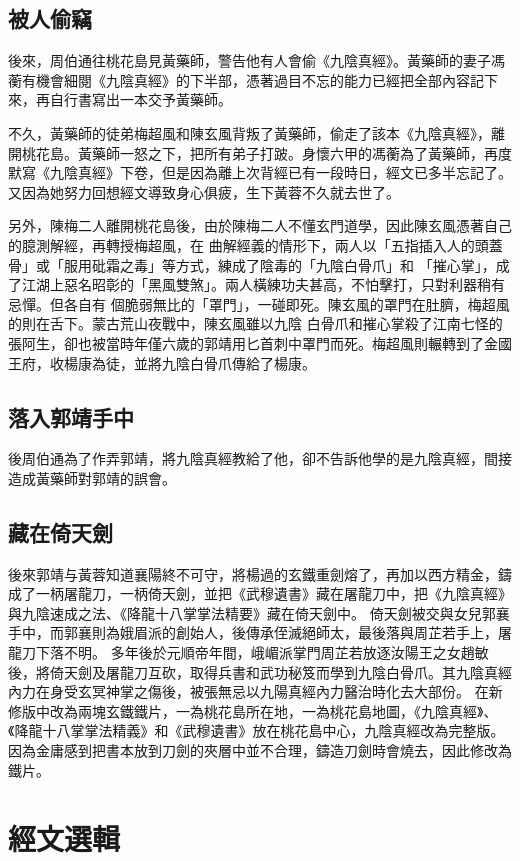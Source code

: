 \subsection{被人偷竊}
後來，周伯通往桃花島見黃藥師，警告他有人會偷《九陰真經》。黃藥師的妻子馮蘅有機會細閱《九陰真經》的下半部，憑著過目不忘的能力已經把全部內容記下來，再自行書寫出一本交予黃藥師。

不久，黃藥師的徒弟梅超風和陳玄風背叛了黃藥師，偷走了該本《九陰真經》，離開桃花島。黃藥師一怒之下，把所有弟子打跛。身懷六甲的馮蘅為了黃藥師，再度默寫《九陰真經》下卷，但是因為離上次背經已有一段時日，經文已多半忘記了。又因為她努力回想經文導致身心俱疲，生下黃蓉不久就去世了。

另外，陳梅二人離開桃花島後，由於陳梅二人不懂玄門道學，因此陳玄風憑著自己的臆測解經，再轉授梅超風，在
曲解經義的情形下，兩人以「五指插入人的頭蓋骨」或「服用砒霜之毒」等方式，練成了陰毒的「九陰白骨爪」和
「摧心掌」，成了江湖上惡名昭彰的「黑風雙煞」。兩人橫練功夫甚高，不怕擊打，只對利器稍有忌憚。但各自有
個脆弱無比的「罩門」，一碰即死。陳玄風的罩門在肚臍，梅超風的則在舌下。蒙古荒山夜戰中，陳玄風雖以九陰
白骨爪和摧心掌殺了江南七怪的張阿生，卻也被當時年僅六歲的郭靖用匕首刺中罩門而死。梅超風則輾轉到了金國
王府，收楊康為徒，並將九陰白骨爪傳給了楊康。

\subsection{落入郭靖手中}
後周伯通為了作弄郭靖，將九陰真經教給了他，卻不告訴他學的是九陰真經，間接造成黃藥師對郭靖的誤會。
\subsection{藏在倚天劍}
後來郭靖与黃蓉知道襄陽終不可守，將楊過的玄鐵重劍熔了，再加以西方精金，鑄成了一柄屠龍刀，一柄倚天劍，並把《武穆遺書》藏在屠龍刀中，把《九陰真經》與九陰速成之法、《降龍十八掌掌法精要》藏在倚天劍中。 倚天劍被交與女兒郭襄手中，而郭襄則為娥眉派的創始人，後傳承侄滅絕師太，最後落與周芷若手上，屠龍刀下落不明。 多年後於元順帝年間，峨嵋派掌門周芷若放逐汝陽王之女趙敏後，將倚天劍及屠龍刀互砍，取得兵書和武功秘笈而學到九陰白骨爪。其九陰真經內力在身受玄冥神掌之傷後，被張無忌以九陽真經內力醫治時化去大部份。 在新修版中改為兩塊玄鐵鐵片，一為桃花島所在地，一為桃花島地圖，《九陰真經》、《降龍十八掌掌法精義》和《武穆遺書》放在桃花島中心，九陰真經改為完整版。因為金庸感到把書本放到刀劍的夾層中並不合理，鑄造刀劍時會燒去，因此修改為鐵片。
\section{經文選輯}

